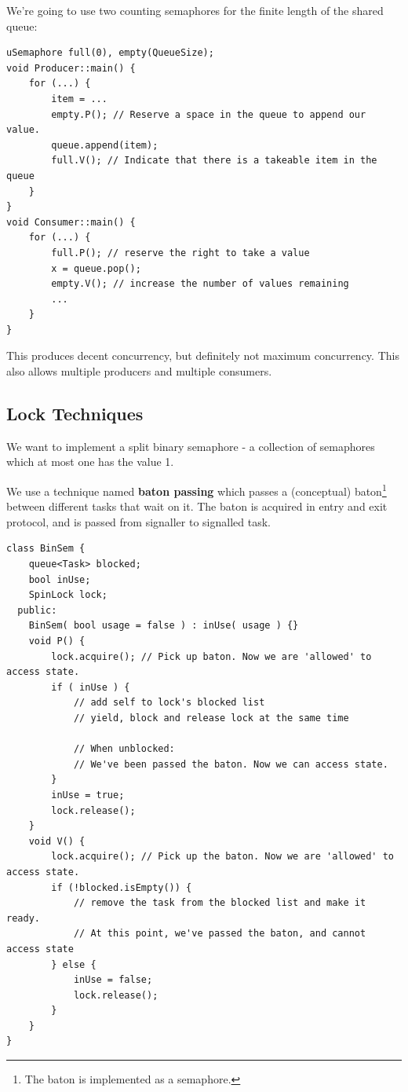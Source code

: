                     We're going to use two counting semaphores for the finite length of the shared queue:
                    \begin{lstlisting}
uSemaphore full(0), empty(QueueSize);
void Producer::main() {
    for (...) {
        item = ...
        empty.P(); // Reserve a space in the queue to append our value.
        queue.append(item);
        full.V(); // Indicate that there is a takeable item in the queue
    }
}
void Consumer::main() {
    for (...) {
        full.P(); // reserve the right to take a value
        x = queue.pop();
        empty.V(); // increase the number of values remaining
        ...
    }
}
                    \end{lstlisting}
                    This produces decent concurrency, but definitely not maximum concurrency.
                    This also allows multiple producers and multiple consumers.
            \subsection{Lock Techniques} %
            \label{sub:lock_techniques}
                We want to implement a split binary semaphore - a collection of semaphores which at most one has the value 1.

                We use a technique named \textbf{baton passing} which passes a (conceptual) baton\footnote{The baton is implemented as a semaphore.} between different tasks that wait on it.
                The baton is acquired in entry and exit protocol, and is passed from signaller to signalled task.
                \begin{lstlisting}
class BinSem {
    queue<Task> blocked;
    bool inUse;
    SpinLock lock;
  public:
    BinSem( bool usage = false ) : inUse( usage ) {}
    void P() {
        lock.acquire(); // Pick up baton. Now we are 'allowed' to access state.
        if ( inUse ) {
            // add self to lock's blocked list
            // yield, block and release lock at the same time

            // When unblocked:
            // We've been passed the baton. Now we can access state.
        }
        inUse = true;
        lock.release();
    }
    void V() {
        lock.acquire(); // Pick up the baton. Now we are 'allowed' to access state.
        if (!blocked.isEmpty()) {
            // remove the task from the blocked list and make it ready.
            // At this point, we've passed the baton, and cannot access state
        } else {
            inUse = false;
            lock.release();
        }
    }
}
                \end{lstlisting}
